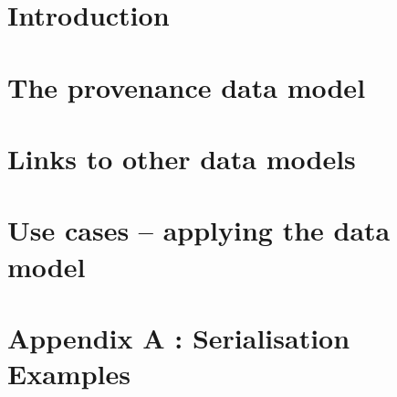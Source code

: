 \documentclass[11pt,a4paper]{ivoa}
\begin{document}
\section{Introduction}






\section{The provenance data model}
\label{sec:datamodel}



\clearpage
\section{Links to other data models}
\label{sec:dmlinks}



\clearpage

 



\section{Use cases -- applying the data model}
\label{sec:usecases-implementations}



\appendix
\section{Appendix A : Serialisation Examples}
\label{sec:appendixA}

\end{document}
